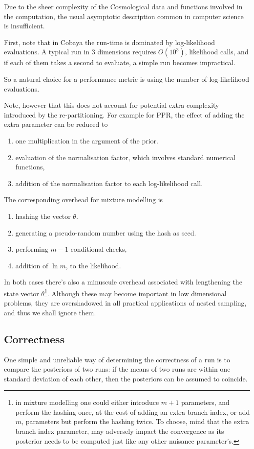 \documentclass[usenatbib]{mnras}
\begin{document}
Due to the sheer complexity of the Cosmological data and functions
involved in the computation, the usual asymptotic description
common in computer science is insufficient. 

First, note that in Cobaya  the run-time is dominated
by log-likelihood evaluations. A typical run in 3 dimensions
requires \(O(10^{3})\), likelihood calls, and if each of them takes a
second to evaluate, a simple run becomes impractical. 

So a natural choice for a performance metric is using the number of
log-likelihood evaluations. 

Note, however that this does not account for potential extra
complexity introduced by the re-partitioning. For example for PPR,
the effect of adding the extra parameter can be reduced to
\begin{enumerate}
\item one multiplication in the argument of the prior.
\item evaluation of the normalisation factor, which involves standard
numerical functions,
\item addition of the normalisation factor to each log-likelihood call.
\end{enumerate}

The corresponding overhead for mixture modelling is
\begin{enumerate}
\item hashing the vector \(\theta\).
\item generating a pseudo-random number using the hash as seed.
\item performing \(m-1\) conditional checks,
\item addition of \(\ln m\), to the likelihood.
\end{enumerate}

In both cases there's also a minuscule overhead associated with
lengthening the state vector \(\theta\)\footnote{in mixture modelling one could either introduce \(m+1\)
parameters, and perform the hashing once, at the cost of adding an
extra branch index, or add \(m\), parameters but perform the hashing
twice. To choose, mind that the extra branch index parameter, may
adversely impact the convergence as its posterior needs to be computed
just like any other nuisance parameter's.}.  Although these may
become important in low dimensional problems, they are overshadowed
in all practical applications of nested sampling, and thus we shall
ignore them.

\subsection{Correctness}
\label{sec:org6d89423}
One simple and unreliable way of determining the correctness of a
run is to compare the posteriors of two runs: if the means of two
runs are within one standard deviation of each other, then the
posteriors can be assumed to coincide.
\end{document}
